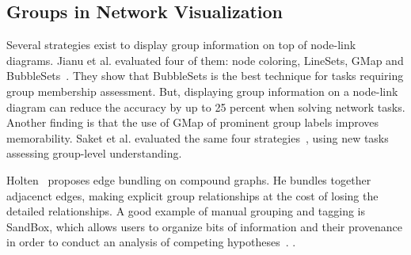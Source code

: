 

\subsection{Groups in Network Visualization}

Several strategies exist to display group information on top of node-link diagrams. Jianu et al. evaluated four of them: node coloring, LineSets, GMap and BubbleSets~\cite{Jianu14}. They show that BubbleSets is the best technique for tasks requiring group membership assessment.
But, displaying group information on a node-link diagram can reduce the accuracy by up to 25 percent when solving network tasks.
Another finding is that the use of GMap of prominent group labels improves memorability. Saket et al. evaluated the same four strategies~\cite{Saket14}, using new tasks assessing group-level understanding.

Holten~\cite{Holten2006HierEdgeBundles} proposes edge bundling on compound graphs. He bundles together adjacenct edges, making explicit group relationships at the cost of losing the detailed relationships.
A good example of manual grouping and tagging is SandBox, which allows users to organize bits of information and their provenance in order to conduct an analysis of competing hypotheses~\cite{proulx06sandbox}. .


